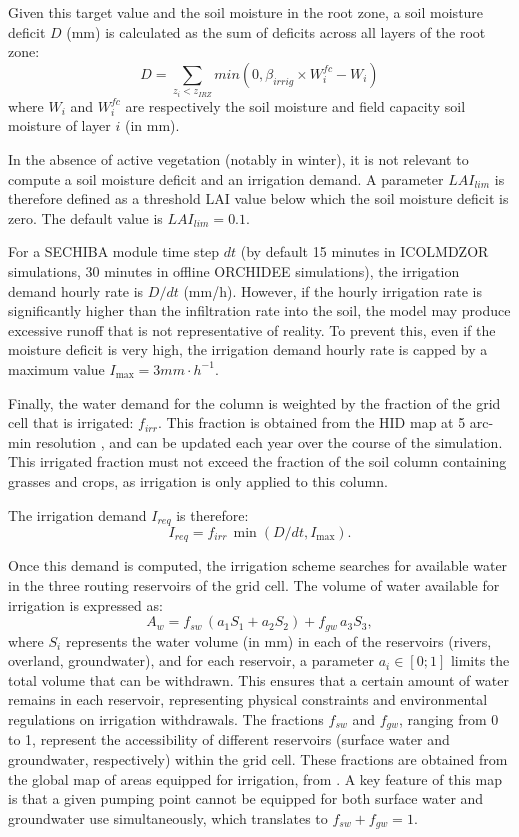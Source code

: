 Given this target value and the soil moisture in the root zone, a soil moisture deficit $D$ (mm) is calculated as the sum of deficits across all layers of the root zone:
\begin{equation}
    D = \sum_{z_i < z_{IRZ}} min(0,\beta_{irrig} \times W_i^{fc} - W_i)
\end{equation}
where $W_i$ and $W_i^{fc}$ are respectively the soil moisture and field capacity soil moisture of layer $i$ (in mm).

In the absence of active vegetation (notably in winter), it is not relevant to compute a soil moisture deficit and an irrigation demand. A parameter $LAI_{lim}$ is therefore defined as a threshold LAI value below which the soil moisture deficit is zero. The default value is $LAI_{lim}=0.1$.

For a SECHIBA module time step $dt$ (by default 15 minutes in ICOLMDZOR simulations, 30 minutes in offline ORCHIDEE simulations), the irrigation demand hourly rate is $D/dt$ (mm/h). However, if the hourly irrigation rate is significantly higher than the infiltration rate into the soil, the model may produce excessive runoff that is not representative of reality. To prevent this, even if the moisture deficit is very high, the irrigation demand hourly rate is capped by a maximum value $I_{\max} = 3 mm \cdot h^{-1}$.

Finally, the water demand for the column is weighted by the fraction of the grid cell that is irrigated: $f_{irr}$. This fraction is obtained from the HID map at 5 arc-min resolution \citep{siebert_quantifying_2010}, and can be updated each year over the course of the simulation.
This irrigated fraction must not exceed the fraction of the soil column containing grasses and crops, as irrigation is only applied to this column.

The irrigation demand $I_{req}$ is therefore:
\begin{equation}
    I_{req} = f_{irr} \, \min(D/dt, I_{\max}).
\end{equation}

Once this demand is computed, the irrigation scheme searches for available water in the three routing reservoirs of the grid cell.
The volume of water available for irrigation is expressed as:
\begin{equation}
    A_w = f_{sw} \, (a_1 S_1 + a_2 S_2)+ f_{gw} \, a_3 S_3,
\end{equation}
where $S_i$ represents the water volume (in mm) in each of the reservoirs (rivers, overland, groundwater), and for each reservoir, a parameter $a_i \in [0;1]$ limits the total volume that can be withdrawn. This ensures that a certain amount of water remains in each reservoir, representing physical constraints and environmental regulations on irrigation withdrawals.
The fractions $f_{sw}$ and $f_{gw}$, ranging from 0 to 1, represent the accessibility of different reservoirs (surface water and groundwater, respectively) within the grid cell. These fractions are obtained from the global map of areas equipped for irrigation, from \citet{siebert_groundwater_2010}. A key feature of this map is that a given pumping point cannot be equipped for both surface water and groundwater use simultaneously, which translates to $f_{sw} + f_{gw} =1$.

